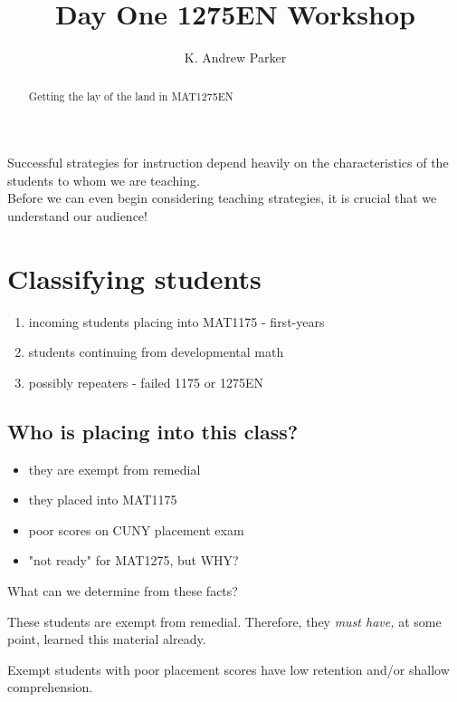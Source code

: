 \documentclass{ximera}
\title{Day One 1275EN Workshop}
\author{K. Andrew Parker}
\begin{document}
\begin{abstract}
Getting the lay of the land in MAT1275EN
\end{abstract}

\maketitle

Successful strategies for instruction depend heavily on the characteristics of the students to whom we are teaching.\\

Before we can even begin considering teaching strategies, it is crucial that we understand our audience! \\


\section{Classifying students}

\begin{enumerate}
\item incoming students placing into MAT1175 - first-years
\item students continuing from developmental math
\item possibly repeaters - failed 1175 or 1275EN
\end{enumerate}

\subsection{Who is placing into this class?}

\begin{itemize}
\item they are exempt from remedial
\item they placed into MAT1175
\item poor scores on CUNY placement exam
\item "not ready" for MAT1275, but WHY?
\end{itemize}

What can we determine from these facts?

\begin{lemma}
These students are exempt from remedial. Therefore, they \emph{must have,} at some point, learned this material already.
\end{lemma}

\begin{lemma}
Exempt students with poor placement scores have low retention and/or shallow comprehension.
\end{lemma}
\end{document}
